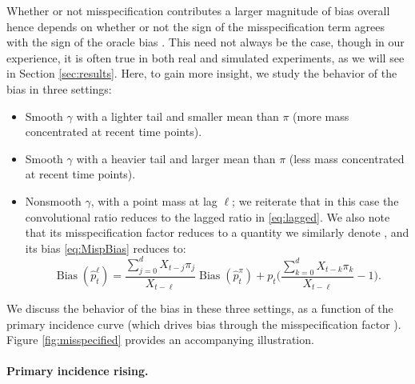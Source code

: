 \documentclass{article}
\renewcommand{\hat}{\widehat} %
\DeclareMathOperator{\bias}{Bias}
\begin{document}
Whether or not misspecification contributes a larger magnitude of bias overall
hence depends on whether or not the sign of the misspecification term  agrees with the sign of the oracle bias
\smash{$\bias(\hat{p}_t^\pi)$}. This need not always be the case, though in our
experience, it is often true in both real and simulated experiments, as we will
see in Section \ref{sec:results}. Here, to gain more insight, we study the
behavior of the bias in three settings: 
\begin{itemize} 
\item Smooth $\gamma$ with a lighter tail and smaller mean than $\pi$ (more mass
  concentrated at recent time points).    
\item Smooth $\gamma$ with a heavier tail and larger mean than $\pi$ (less mass
  concentrated at recent time points).    
\item Nonsmooth $\gamma$, with a point mass at lag $\ell$; we reiterate that in 
  this case the convolutional ratio reduces to the lagged ratio
  \smash{$\hat{p}_t^\ell$} in \eqref{eq:lagged}. We also note that its
  misspecification factor  reduces to a quantity we
  similarly denote , and its bias \eqref{eq:MispBias} reduces to: 
  \begin{equation}
  \label{eq:LagBias}
  \bias(\hat{p}_t^\ell) = \frac{\sum_{j=0}^d X_{t-j}\pi_j}{X_{t-\ell}}
  \bias(\hat{p}_t^\pi) + p_t \Bigg(\frac{\sum_{k=0}^d X_{t-k}\pi_k}{X_{t-\ell}}
  - 1 \Bigg).  
\end{equation}
\end{itemize}

We discuss the behavior of the bias in these three settings, as a function of
the primary incidence curve (which drives bias through the misspecification
factor ). Figure \ref{fig:misspecified} provides an
accompanying illustration.

\paragraph{Primary incidence rising.} 
\end{document}
